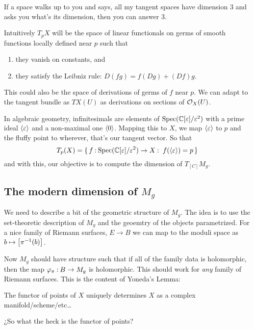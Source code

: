 \documentclass[12pt]{memoir}
\begin{document}
\begin{significant}
If a space walks up to you and says, all my tangent spaces have dimension 3 and asks you what's its dimension, then you can answer 3.
\end{significant}

Intuitively $T_pX$ will be the space of linear functionals on germs of smooth functions locally defined near $p$ such that 
\begin{enumerate}
    \item they vanish on constants, and
    \item they satisfy the Leibniz rule: $D(fg)=f(Dg)+(Df)g$.
\end{enumerate}
This could also be the space of derivations of germs of $f$ near $p$. We can adapt to the tangent bundle as $TX(U)$ as derivations on sections of $\mathcal{O}_X(U)$.\par
In algebraic geometry, infinitesimals are elements of $\operatorname{Spec}(\mathbb{C}[\varepsilon]/\varepsilon^2)$ with a prime ideal $\left\langle \varepsilon\right\rangle$ and a non-maximal one $\left\langle 0\right\rangle$. Mapping this to $X$, we map $\left\langle \varepsilon\right\rangle$ to $p$ and the fluffy point to wherever, that's our tangent vector. So that 
$$T_p(X)=\{\,f\mathbin{:}\operatorname{Spec}(\mathbb{C}[\varepsilon]/\varepsilon^2)\to X\mathbin{:}\ f(\left\langle \varepsilon\right\rangle)=p\,\}$$
and with this, our objective is to compute the dimension of $T_{[C]}M_g$.

\subsection{The modern dimension of $M_g$}

We need to describe a bit of the geometric structure of $M_g$. The idea is to use the set-theoretic description of $M_g$ and the geoemtry of the objects parametrized. For a nice family of Riemann surfaces, $E\to B$ we can map to the moduli space as $b\mapsto\left\lbrack\pi^{-1}(b)\right\rbrack$.\par
Now $M_g$ should have structure such that if all of the family data is holomorphic, then the map $\varphi_\pi\mathbin{:} B\to M_g$ is holomorphic. This should work for \emph{any} family of Riemann surfaces. This is the content of Yoneda's Lemma:

\begin{Lem}
    The functor of points of $X$ uniquely determines $X$ as a complex manifold/scheme/etc\dots
\end{Lem}

\begin{significant}
    ¿So what the heck is the functor of points?
\end{significant}
\end{document}

